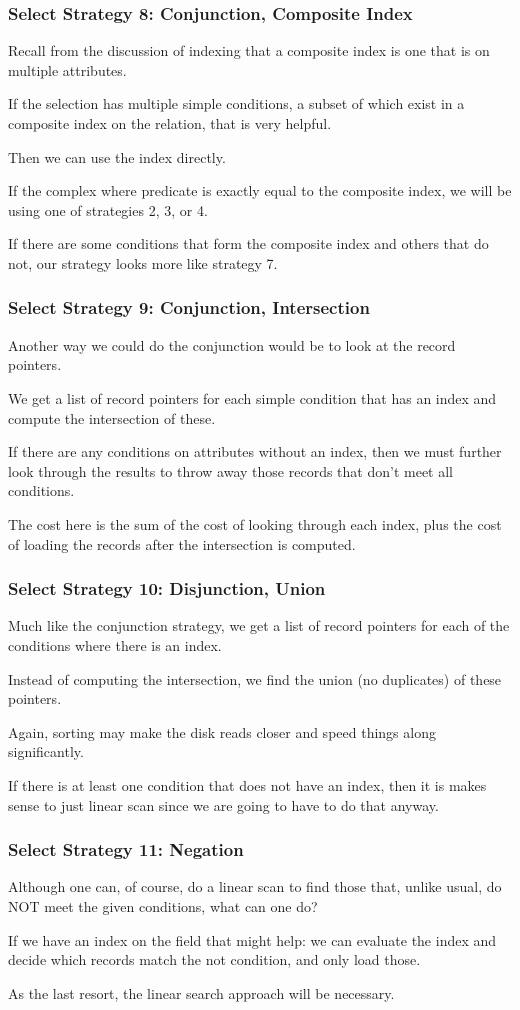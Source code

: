 \begin{frame}
\frametitle{Select Strategy 8: Conjunction, Composite Index}
Recall from the discussion of indexing that a composite index is one that is on multiple attributes. 

If the selection has multiple simple conditions, a subset of which exist in a composite index on the relation, that is very helpful. 

Then we can use the index directly. 

If the complex where predicate is exactly equal to the composite index, we will be using one of strategies 2, 3, or 4. 

If there are some conditions that form the composite index and others that do not, our strategy looks more like strategy 7.

\end{frame}

\begin{frame}
\frametitle{Select Strategy 9: Conjunction, Intersection}
Another way we could do the conjunction would be to look at the record pointers. 

We get a list of record pointers for each simple condition that has an index and compute the intersection of these. 

If there are any conditions on attributes without an index, then we must further look through the results to throw away those records that don't meet all conditions.

The cost here is the sum of the cost of looking through each index, plus the cost of loading the records after the intersection is computed. 

\end{frame}

\begin{frame}
\frametitle{Select Strategy 10: Disjunction, Union}
Much like the conjunction strategy, we get a list of record pointers for each of the conditions where there is an index. 

Instead of computing the intersection, we find the union (no duplicates) of these pointers. 

Again, sorting may make the disk reads closer and speed things along significantly.

If there is at least one condition that does not have an index, then it is makes sense to just linear scan since we are going to have to do that anyway.

\end{frame}

\begin{frame}
\frametitle{Select Strategy 11: Negation}

Although one can, of course, do a linear scan to find those that, unlike usual, do NOT meet the given conditions, what can one do? 

If we have an index on the field that might help: we can evaluate the index and decide which records match the not condition, and only load those. 

As the last resort, the linear search approach will be necessary.

\end{frame}



